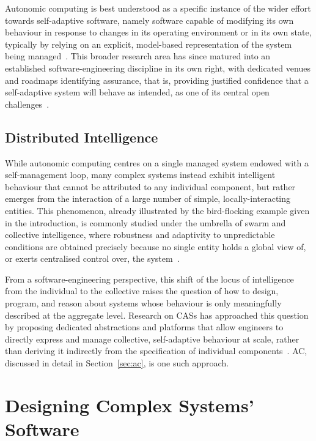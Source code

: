 Autonomic computing is best understood as a specific instance of the wider effort towards self-adaptive software,
namely software capable of modifying its own behaviour in response to changes in its operating environment or in its own state,
typically by relying on an explicit, model-based representation of the system being managed~\cite{karsai1999saso}.
%
This broader research area has since matured into an established software-engineering discipline in its own right,
with dedicated venues and roadmaps identifying assurance,
that is, providing justified confidence that a self-adaptive system will behave as intended,
as one of its central open challenges~\cite{delemos2013swese}.

\section{Distributed Intelligence}
\label{sec:distributed-intelligence}

While autonomic computing centres on a single managed system endowed with a self-management loop,
many complex systems instead exhibit intelligent behaviour that cannot be attributed to any individual component,
but rather emerges from the interaction of a large number of simple, locally-interacting entities.
%
This phenomenon,
already illustrated by the bird-flocking example given in the introduction,
is commonly studied under the umbrella of swarm and collective intelligence,
where robustness and adaptivity to unpredictable conditions are obtained precisely because no single entity holds a global view of, or exerts centralised control over, the system~\cite{schranz2021swevo}.

From a software-engineering perspective,
this shift of the locus of intelligence from the individual to the collective raises the question of how to design, program, and reason about systems whose behaviour is only meaningfully described at the aggregate level.
%
Research on \acp{CAS} has approached this question by proposing dedicated abstractions and platforms
that allow engineers to directly express and manage collective, self-adaptive behaviour at scale,
rather than deriving it indirectly from the specification of individual components~\cite{DBLP:conf/saso/CasadeiV18}.
%
\ac{AC},
discussed in detail in Section~\ref{sec:ac},
is one such approach.

\chapter{Designing Complex Systems' Software}

